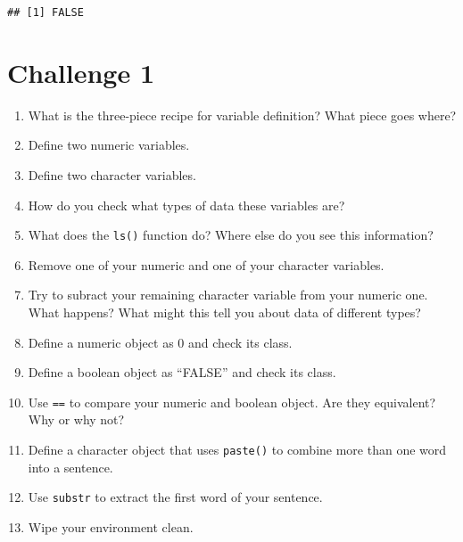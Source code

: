 \documentclass[]{article}
\providecommand{\tightlist}{%
  \setlength{\itemsep}{0pt}\setlength{\parskip}{0pt}}
\begin{document}
\begin{verbatim}
## [1] FALSE
\end{verbatim}

\section{\texorpdfstring{\textbf{Challenge
1}}{Challenge 1}}\label{challenge-1}

\begin{enumerate}
\def\labelenumi{\arabic{enumi}.}
\tightlist
\item
  What is the three-piece recipe for variable definition? What piece
  goes where?\\
\item
  Define two numeric variables.\\
\item
  Define two character variables.\\
\item
  How do you check what types of data these variables are?\\
\item
  What does the \texttt{ls()} function do? Where else do you see this
  information?\\
\item
  Remove one of your numeric and one of your character variables.\\
\item
  Try to subract your remaining character variable from your numeric
  one. What happens? What might this tell you about data of different
  types?\\
\item
  Define a numeric object as 0 and check its class.\\
\item
  Define a boolean object as ``FALSE'' and check its class.\\
\item
  Use \texttt{==} to compare your numeric and boolean object. Are they
  equivalent? Why or why not?\\
\item
  Define a character object that uses \texttt{paste()} to combine more
  than one word into a sentence.\\
\item
  Use \texttt{substr} to extract the first word of your sentence.\\
\item
  Wipe your environment clean.
\end{enumerate}
\end{document}
